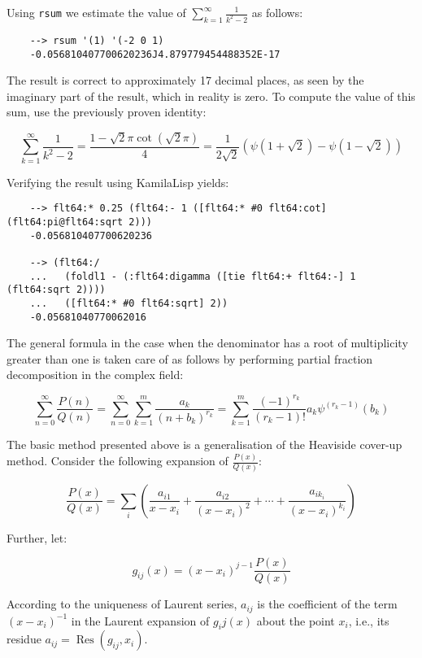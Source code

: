 Using \verb|rsum| we estimate the value of $\displaystyle \sum_{k=1}^{\infty} \frac{1}{k^2-2}$ as follows:

\begin{Verbatim}
    --> rsum '(1) '(-2 0 1)
    -0.056810407700620236J4.879779454488352E-17
\end{Verbatim}

The result is correct to approximately 17 decimal places, as seen by the imaginary part of the result, which in reality is zero. To compute the value of this sum, use the previously proven identity:

$$\sum_{k=1}^\infty \frac{1}{k^2 - 2} = \frac{1-\sqrt{2}\pi\cot(\sqrt{2}\pi)}{4} = \frac{1}{2\sqrt{2}}\left(\psi\left(1+\sqrt{2}\right)-\psi\left(1-\sqrt{2}\right)\right)$$

Verifying the result using KamilaLisp yields:

\begin{Verbatim}
    --> flt64:* 0.25 (flt64:- 1 ([flt64:* #0 flt64:cot] (flt64:pi@flt64:sqrt 2)))
    -0.056810407700620236

    --> (flt64:/
    ...   (foldl1 - (:flt64:digamma ([tie flt64:+ flt64:-] 1 (flt64:sqrt 2))))
    ...   ([flt64:* #0 flt64:sqrt] 2))
    -0.05681040770062016
\end{Verbatim}

The general formula in the case when the denominator has a root of multiplicity greater than one is taken care of as follows by performing partial fraction decomposition in the complex field:

$$
\sum_{n=0}^{\infty }\frac{P(n)}{Q(n)}=\sum _{n=0}^{\infty }\sum
_{k=1}^{m}{\frac {a_{k}}{(n+b_{k})^{r_{k}}}}=\sum _{k=1}^{m}{\frac
{(-1)^{r_{k}}}{(r_{k}-1)!}}a_{k}\psi ^{(r_{k}-1)}(b_{k})
$$

The basic method presented above is a generalisation of the Heaviside cover-up method. Consider the following expansion of $\frac{P(x)}{Q(x)}$:

$$
\frac{P(x)}{Q(x)}=\sum _{i}\left({\frac {a_{i1}}{x-x_{i}}}+{\frac {a_{i2}}{(x-x_{i})^{2}}}+\cdots +{\frac {a_{ik_{i}}}{(x-x_{i})^{k_{i}}}}\right)
$$

Further, let:

$$
g_{ij}(x)=(x-x_{i})^{j-1}\frac{P(x)}{Q(x)}
$$

According to the uniqueness of Laurent series, $a_{ij}$ is the coefficient of the term $(x − x_i)^{−1}$ in the Laurent expansion of $g_ij(x)$ about the point $x_i$, i.e., its residue ${\displaystyle a_{ij}=\operatorname {Res} (g_{ij},x_{i})}$.

